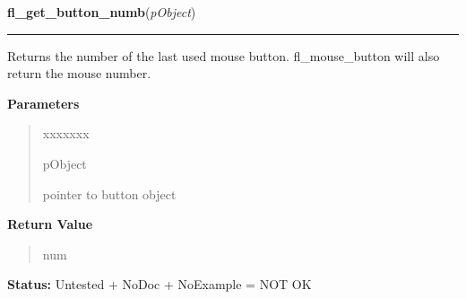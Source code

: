 \hspace{.8\funcindent}\begin{boxedminipage}{\funcwidth}

    \raggedright \textbf{fl\_get\_button\_numb}(\textit{pObject})

    \vspace{-1.5ex}

    \rule{\textwidth}{0.5\fboxrule}
\setlength{\parskip}{2ex}
    Returns the number of the last used  mouse button. fl\_mouse\_button 
    will also return the mouse number.

\setlength{\parskip}{1ex}
      \textbf{Parameters}
      \vspace{-1ex}

      \begin{quote}
        \begin{Ventry}{xxxxxxx}

          \item[pObject]

          pointer to button object

        \end{Ventry}

      \end{quote}

      \textbf{Return Value}
    \vspace{-1ex}

      \begin{quote}
      num

      \end{quote}

\textbf{Status:} Untested + NoDoc + NoExample = NOT OK



    \end{boxedminipage}

    \label{xformslib:library:fl_set_object_shortcut}

    \vspace{0.5ex}

